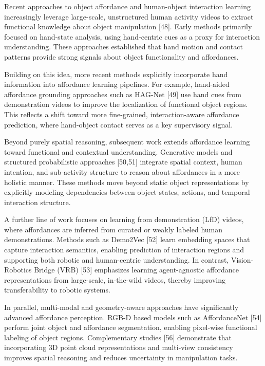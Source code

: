 Recent approaches to object affordance and human-object interaction learning increasingly leverage large-scale, unstructured human activity videos to extract functional knowledge about object manipulation [48]. Early methods primarily focused on hand-state analysis, using hand-centric cues as a proxy for interaction understanding. These approaches established that hand motion and contact patterns provide strong signals about object functionality and affordances.

Building on this idea, more recent methods explicitly incorporate hand information into affordance learning pipelines. For example, hand-aided affordance grounding approaches such as HAG-Net [49] use hand cues from demonstration videos to improve the localization of functional object regions. This reflects a shift toward more fine-grained, interaction-aware affordance prediction, where hand-object contact serves as a key supervisory signal.

Beyond purely spatial reasoning, subsequent work extends affordance learning toward functional and contextual understanding. Generative models and structured probabilistic approaches [50,51] integrate spatial context, human intention, and sub-activity structure to reason about affordances in a more holistic manner. These methods move beyond static object representations by explicitly modeling dependencies between object states, actions, and temporal interaction structure.

A further line of work focuses on learning from demonstration (LfD) videos, where affordances are inferred from curated or weakly labeled human demonstrations. Methods such as Demo2Vec [52] learn embedding spaces that capture interaction semantics, enabling prediction of interaction regions and supporting both robotic and human-centric understanding. In contrast, Vision-Robotics Bridge (VRB) [53] emphasizes learning agent-agnostic affordance representations from large-scale, in-the-wild videos, thereby improving transferability to robotic systems.

In parallel, multi-modal and geometry-aware approaches have significantly advanced affordance perception. RGB-D based models such as AffordanceNet [54] perform joint object and affordance segmentation, enabling pixel-wise functional labeling of object regions. Complementary studies [56] demonstrate that incorporating 3D point cloud representations and multi-view consistency improves spatial reasoning and reduces uncertainty in manipulation tasks.

